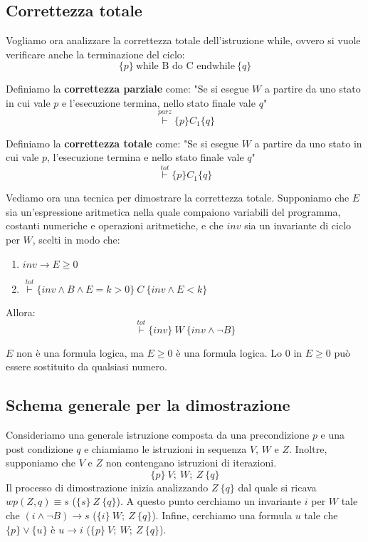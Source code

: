 \subsection{Correttezza totale}
Vogliamo ora analizzare la correttezza totale dell'istruzione while, ovvero si
vuole verificare anche la terminazione del ciclo:
\begin{equation}
    \{p\} \ \text{while B do C endwhile} \ \{q\}
\end{equation}
\begin{definizione}
    Definiamo la \textbf{correttezza parziale} come: "Se si esegue $W$ a partire
    da uno stato in cui vale $p$ e l'esecuzione termina, nello stato finale vale
    $q$" $$\stackrel{parz}{\vdash} \{p\} C_1 \{q\}$$
\end{definizione}
\begin{definizione}
    Definiamo la \textbf{correttezza totale} come: "Se si esegue $W$ a partire
    da uno stato in cui vale $p$, l'esecuzione termina e nello stato finale vale
    $q$" $$\stackrel{tot}{\vdash} \{p\} C_1 \{q\}$$
\end{definizione}
Vediamo ora una tecnica per dimostrare la correttezza totale. Supponiamo che $E$
sia un'espressione aritmetica nella quale compaiono variabili del programma, costanti
numeriche e operazioni aritmetiche, e che $inv$ sia un invariante di ciclo per $W$,
scelti in modo che:
\begin{enumerate}
    \item $inv \to E \geq 0$
    \item $\stackrel{tot}{\vdash} \{inv \land B \land E = k > 0\} \ C \ \{inv \land E < k\}$
\end{enumerate}
Allora:
\begin{equation}
    \stackrel{tot}{\vdash} \{inv\} \ W \ \{inv \land \lnot B\}
\end{equation}
\begin{nota}
    $E$ non è una formula logica, ma $E \geq 0$ è una formula logica. Lo $0$ in
    $E \geq 0$ può essere sostituito da qualsiasi numero.
\end{nota}
\subsection{Schema generale per la dimostrazione}
Consideriamo una generale istruzione composta da una precondizione $p$ e una post
condizione $q$ e chiamiamo le istruzioni in sequenza $V$, $W$ e $Z$. Inoltre, supponiamo che $V$ e $Z$ non contengano istruzioni di iterazioni.$$\{p\} \ V; \ W; \ Z \ \{q\}$$ Il processo di dimostrazione inizia analizzando $Z \ \{q\}$ dal quale si ricava $wp(Z, q) \equiv s$ ($\{s\} \ Z \ \{q\}$). A questo punto cerchiamo un invariante $i$ per $W$ tale che $(i \land \lnot B) \to s$ ($\{i\} \ W; \ Z \ \{q\}$). Infine, cerchiamo una formula $u$ tale che $\{p\} \lor \{u\}$ è $u \to i$ ($\{p\} \ V; \ W; \ Z \ \{q\}$).
